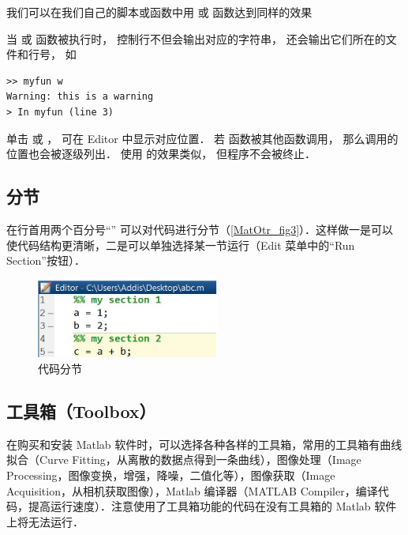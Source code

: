 我们可以在我们自己的脚本或函数中用  或  函数达到同样的效果


当  或  函数被执行时， 控制行不但会输出对应的字符串， 还会输出它们所在的文件和行号， 如
\begin{lstlisting}[language=MatlabCom]
>> myfun w
Warning: this is a warning
> In myfun (line 3)
\end{lstlisting}
单击  或 ， 可在 Editor 中显示对应位置． 若  函数被其他函数调用， 那么调用的位置也会被逐级列出． 使用  的效果类似， 但程序不会被终止．

\subsection{分节}
在行首用两个百分号“\x{\%\%}” 可以对代码进行分节（\autoref{MatOtr_fig3}）．这样做一是可以使代码结构更清晰，二是可以单独选择某一节运行（Edit 菜单中的“Run Section”按钮）．
\begin{figure}[ht]
\centering
\includegraphics[width= 6cm]{./figures/MatOtr3.png}
\caption{代码分节}\label{MatOtr_fig3}
\end{figure}

\subsection{工具箱（Toolbox）}
在购买和安装 Matlab 软件时，可以选择各种各样的工具箱，常用的工具箱有曲线拟合（Curve Fitting，从离散的数据点得到一条曲线），图像处理（Image Processing，图像变换，增强，降噪，二值化等），图像获取（Image Acquisition，从相机获取图像），Matlab 编译器（MATLAB Compiler，编译代码，提高运行速度）．注意使用了工具箱功能的代码在没有工具箱的 Matlab 软件上将无法运行．




